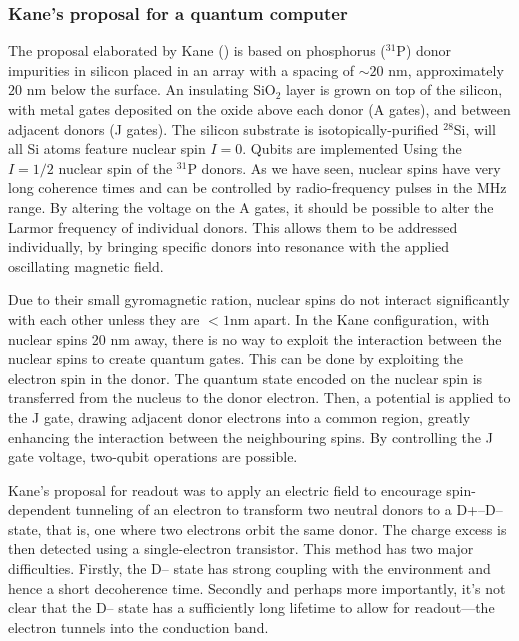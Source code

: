 \documentclass[a4paper,11pt]{article}
\begin{document}
\subsubsection{Kane's proposal for a quantum computer}
The proposal elaborated by Kane (\cite{kane_silicon-based_1998}) is based on phosphorus ($^{31}$P) donor impurities in silicon placed in an array with a spacing of $\sim 20$ nm, approximately $20$ nm below the surface. An insulating SiO$_2$ layer is grown on top of the silicon, with metal gates deposited on the oxide above each donor (A gates), and between adjacent donors (J gates).
\newline The silicon substrate is isotopically-purified $^{28}$Si, will all Si atoms feature nuclear spin $I = 0$. Qubits are implemented Using the $I=1/2$ nuclear spin of the $^{31}$P donors. As we have seen, nuclear spins have very long coherence times and can be controlled by radio-frequency pulses in the MHz range. 
By altering the voltage on the A gates, it should be possible to alter the Larmor frequency of individual donors. This allows them to be addressed individually, by bringing specific donors into resonance with the applied oscillating magnetic field.


Due to their small gyromagnetic ration, nuclear spins do not interact significantly with each other unless they are $<1$nm apart. In the Kane configuration, with nuclear spins 20 nm away, there is no way to exploit the interaction between the nuclear spins to create quantum gates. This can be done by exploiting the electron spin in the donor. The quantum state encoded on the nuclear spin is transferred from the nucleus to the donor electron. Then, a potential is applied to the J gate, drawing adjacent donor electrons into a common region, greatly enhancing the interaction between the neighbouring spins. By controlling the J gate voltage, two-qubit operations are possible.

Kane's proposal for readout was to apply an electric field to encourage spin-dependent tunneling of an electron to transform two neutral donors to a D+–D– state, that is, one where two electrons orbit the same donor. The charge excess is then detected using a single-electron transistor. This method has two major difficulties. Firstly, the D– state has strong coupling with the environment and hence a short decoherence time. Secondly and perhaps more importantly, it's not clear that the D– state has a sufficiently long lifetime to allow for readout—the electron tunnels into the conduction band. 
\end{document}
